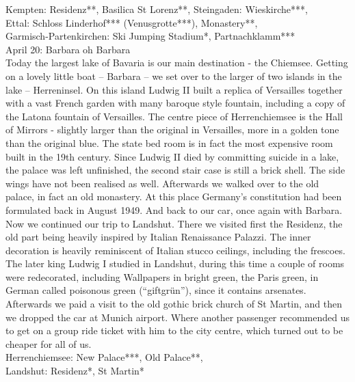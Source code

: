 Kempten: Residenz**, Basilica St Lorenz**, Steingaden: Wieskirche***, \\
Ettal: Schloss Linderhof*** (Venusgrotte***), Monastery**,\\
 Garmisch-Partenkirchen: Ski Jumping Stadium*, Partnachklamm***\\

April 20: Barbara oh Barbara\\
Today the largest lake of Bavaria is our main destination - the Chiemsee. Getting on a lovely little boat -- Barbara -- we set over to the larger of two islands in the lake -- Herreninsel. On this island Ludwig II built a replica of Versailles together with a vast French garden with many baroque style fountain, including a copy of the Latona fountain of Versailles. The centre piece of Herrenchiemsee is the Hall of Mirrors - slightly larger than the original in Versailles, more in a golden tone than the original blue. The state bed room is in fact the most expensive room built in the 19th century. Since Ludwig II died by committing suicide in a lake, the palace was left unfinished, the second stair case is still a brick shell. The side wings have not been realised as well. Afterwards we walked over to the old palace, in fact an old monastery. At this place Germany's constitution had been formulated back in August 1949. And back to our car, once again with Barbara. Now we continued our trip to Landshut. There we visited first the Residenz, the old part being heavily inspired by Italian Renaissance Palazzi. The inner decoration is heavily reminiscent of Italian stucco ceilings, including the frescoes. The later king Ludwig I studied in Landshut, during this time a couple of rooms were redecorated, including Wallpapers in bright green, the Paris green, in German called poisonous green (``giftgr\"un''), since it contains arsenates. Afterwards we paid a visit to the old gothic brick church of St Martin, and then we dropped the car at Munich airport. Where another passenger recommended us to get on a group ride ticket with him to the city centre, which turned out to be cheaper for all of us.\\

Herrenchiemsee: New Palace***, Old Palace**, \\
Landshut: Residenz*, St Martin*\\

